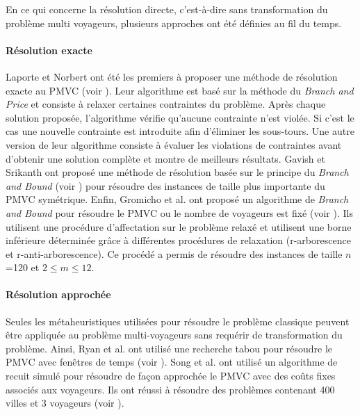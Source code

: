   En ce qui concerne la résolution directe, c'est-à-dire sans transformation du problème multi voyageurs, plusieurs approches ont été définies au fil du temps.
  
  \paragraph{Résolution exacte}
  
  Laporte et Norbert ont été les premiers à proposer une méthode de résolution exacte au PMVC (voir \cite{Laporte1980}). Leur algorithme est basé sur la méthode du \textit{Branch and Price} et consiste à relaxer certaines contraintes du problème. Après chaque solution proposée, l'algorithme vérifie qu'aucune contrainte n'est violée. Si c'est le cas une nouvelle contrainte est introduite afin d'éliminer les sous-tours. Une autre version de leur algorithme consiste à évaluer les violations de contraintes avant d'obtenir une solution complète et montre de meilleurs résultats.
  Gavish et Srikanth ont proposé une méthode de résolution basée sur le principe du \textit{Branch and Bound} (voir \cite{Gavish1986}) pour résoudre des instances de taille plus importante du PMVC symétrique.
  Enfin, Gromicho et al. ont proposé un algorithme de \textit{Branch and Bound} pour résoudre le PMVC ou le nombre de voyageurs est fixé (voir \cite{Gromicho1992}). Ils utilisent une procédure d'affectation sur le problème relaxé et utilisent une borne inférieure déterminée grâce à différentes procédures de relaxation (r-arborescence et r-anti-arborescence). Ce procédé a permis de résoudre des instances de taille $n$=120 et $2\leq m\leq 12$.
  
  \paragraph{Résolution approchée}
  Seules les métaheuristiques utilisées pour résoudre le problème classique peuvent être appliquée au problème multi-voyageurs sans requérir de transformation du problème.
  Ainsi, Ryan et al. ont utilisé une recherche tabou pour résoudre le PMVC avec fenêtres de temps (voir \cite{Ryan1998}).
  Song et al. ont utilisé un algorithme de recuit simulé pour résoudre de façon approchée le PMVC avec des coûts fixes associés aux voyageurs. Ils ont réussi à résoudre des problèmes contenant 400 villes et 3 voyageurs (voir \cite{Song2003}).\\
  
